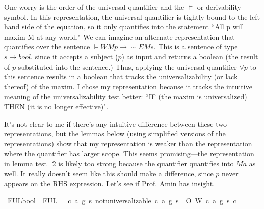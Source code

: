 \begin{isabellebody}
\begin{isamarkuptext}
One worry is the order of the universal quantifier and the $\vDash$ or derivability symbol. In this 
representation, the universal quantifier is tightly bound to the left hand side of the equation, so it 
only quantifies into the statement ``All p will maxim M at any world." We can imagine an alternate
representation that quantifies over the sentence $\vDash W M p \longrightarrow \sim E M s$. This is 
a sentence of type $s \longrightarrow bool$, since it accepts a subject ($p$) as input and returns 
a boolean (the result of $p$ substituted into the sentence.) Thus, applying the universal quantifier 
$\forall p$ to this sentence results in a boolean that tracks the universalizability (or lack thereof) 
of the maxim. I chose my representation because it tracks the intuitive meaning of the universalizability 
test better: ``IF (the maxim is universalized) THEN (it is no longer effective)".

It's not clear to me if there's any intuitive difference between these two representations, but the lemmas 
below (using simplified versions of the representations) show that my representation is weaker than 
the representation where the quantifier has larger scope. This seems promising—the representation in 
lemma test\_2 is likely too strong because the quantifier quantifies into $M a$ as well. It really 
doesn't seem like this should make a difference, since $p$ never appears on the RHS expression. Let's
see if Prof. Amin has insight.%
\end{isamarkuptext}\isamarkuptrue%
\isamarkupfalse%
\ FUL{}{\isacharcolon}{\isacharcolon}bool\ \ {\isachardoublequoteopen}FUL{}\ {\isasymequiv}\ {\isasymforall}\ c\ a\ g\ s{\isachardot}\ not{\isacharunderscore}universalizable\ {\isacharparenleft}c{\isacharcomma}\ a{\isacharcomma}\ g{\isacharparenright}\ s\ {\isasymlongrightarrow}\ {\isasymTurnstile}{\isacharparenleft}{\isacharparenleft}O{\isacharbraceleft}{\isacharparenleft}\isactrlbold {\isasymnot}\ W\ {\isacharparenleft}c{\isacharcomma}\ a{\isacharcomma}\ g{\isacharparenright}\ s{\isacharparenright}{\isacharbar}\ c{\isacharbraceright}{\isacharparenright}{\isacharparenright}{\isachardoublequoteclose}\isanewline
%
\end{isabellebody}
